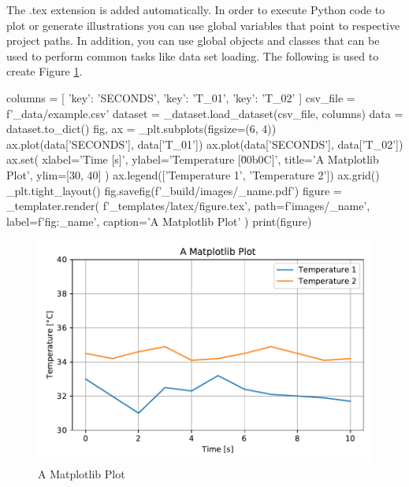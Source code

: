 \documentclass[a4paper]{book}
\begin{document}
The .tex extension is added automatically. In order to execute Python code to plot or generate illustrations you can use global variables that point to respective project paths. In addition, you can use global objects and classes that can be used to perform common tasks like data set loading. The following is used to create Figure \ref{fig:a_matplotlib_plot}.
\begin{python}
columns = [
    {'key': 'SECONDS'},
    {'key': 'T_01'},
    {'key': 'T_02'}
]
csv_file = f'{_data}/example.csv'
dataset = _dataset.load_dataset(csv_file, columns)
data = dataset.to_dict()
fig, ax = _plt.subplots(figsize=(6, 4))
ax.plot(data['SECONDS'], data['T_01'])
ax.plot(data['SECONDS'], data['T_02'])
ax.set(
    xlabel='Time [s]',
    ylabel='Temperature [\u00b0C]',
    title='A Matplotlib Plot',
    ylim=[30, 40]
)
ax.legend(['Temperature 1', 'Temperature 2'])
ax.grid()
_plt.tight_layout()
fig.savefig(f'{_build}/images/{_name}.pdf')
figure = _templater.render(
    f'{_templates}/latex/figure.tex',
    path=f'images/{_name}',
    label=f'fig:{_name}',
    caption='A Matplotlib Plot'
)
print(figure)

\end{python}
\begin{figure}[H]
\begin{center}
  \includegraphics[width=\textwidth]{images/a_matplotlib_plot}
  \caption{A Matplotlib Plot}
  \label{fig:a_matplotlib_plot}
\end{center}
\end{figure}
\end{document}
